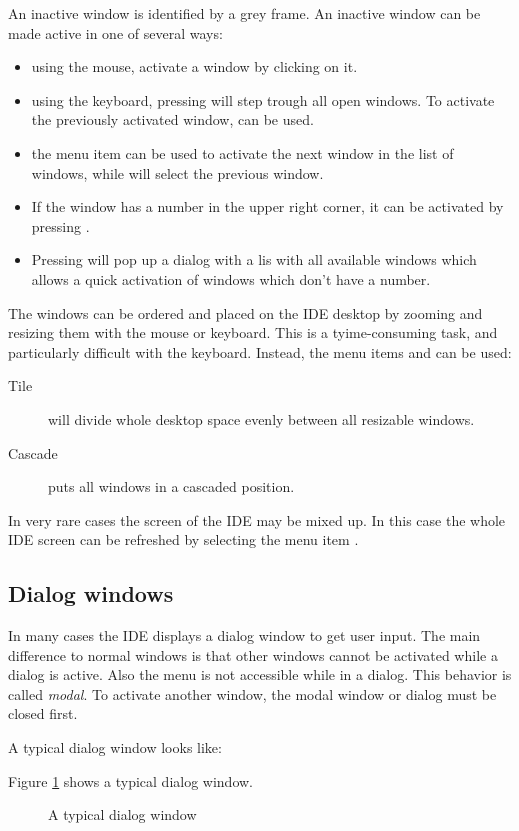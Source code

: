 An inactive window is identified by a grey frame. An inactive window can
be made active in one of several ways:
\begin{itemize}
\item using the mouse, activate a window by clicking on it.
\item using the keyboard, pressing  will step trough all open 
windows. To activate the previously activated window,  can
be used.
\item the menu item  can be used to activate the next 
window in the list of windows, while  will select
the previous window.
\item If the window has a number in the upper right corner, it can be
activated by pressing .
\item Pressing  will pop up a dialog with a lis  with all 
available windows which allows a quick activation of windows which 
don't have a number.
\end{itemize}

The windows can be ordered and placed on the IDE desktop by zooming and
resizing them with the mouse or keyboard. This is a tyime-consuming task, 
and particularly difficult with the keyboard. Instead, the menu items
 and  can be used:
\begin{description}
\item[Tile] will divide whole desktop space evenly between all resizable 
windows. 
\item[Cascade] puts all windows in a cascaded position. 
\end{description}

In very rare cases the screen of the IDE may be mixed up. In this
case the whole IDE screen can be refreshed by selecting the menu item 
.
%
%
\subsection{Dialog windows}
\label{se:dialogwindow}
In many cases the IDE displays a dialog window to get user input.
The main difference to normal windows is that other windows cannot be
activated while a dialog is active. Also the menu is not accessible while in
a dialog. This behavior is called \emph{modal}. To activate another window, 
the modal window or dialog must be closed first.

\begin{htmlonly}
A typical dialog window looks like:
\end{htmlonly}
\begin{latexonly}
Figure \ref{fig:idedlg} shows a typical dialog window.
\begin{figure}
\caption{A typical dialog window}
\label{fig:idedlg}
\ifpdf
{}
\else
{}
\fi
\end{figure}
\end{latexonly}

